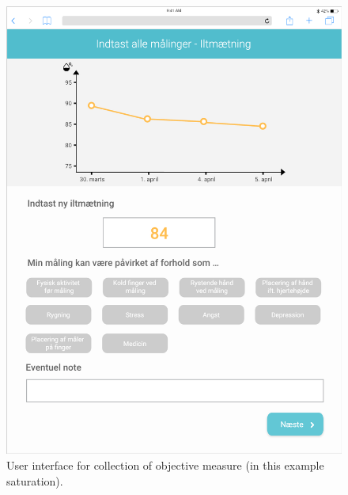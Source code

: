\begin{figure}[h]
  \centering
  \begin{minipage}[b]{0.45\textwidth}
    \includegraphics[width=\textwidth]{images/study2/collectionObj.png}
    \caption{User interface for collection of objective measure (in this example saturation).}
    \label{fig:colObj}
  \end{minipage}
  \hfill
  \begin{minipage}[b]{0.45\textwidth}

\end{minipage}
\end{figure}
